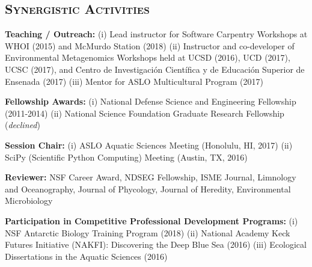 \documentclass[svgnames,11pt]{article}
\begin{document}


\subsection*{\textsc{Synergistic Activities}}

\begin{bibenum}[itemsep=4pt]

    \item \textbf{Teaching / Outreach:} (i) Lead instructor for Software Carpentry Workshops at WHOI (2015) and McMurdo Station (2018) (ii) Instructor and co-developer of Environmental Metagenomics Workshops held at UCSD (2016), UCD (2017), UCSC (2017), and Centro de Investigaci\'{o}n Cient\'{i}fica y de Educaci\'{o}n Superior de Ensenada (2017) (iii) Mentor for ASLO Multicultural Program (2017)

    \item \textbf{Fellowship Awards:} (i) National Defense Science and Engineering Fellowship (2011-2014) (ii) National Science Foundation Graduate Research Fellowship (\textit{declined})

    \item \textbf{Session Chair:} (i) ASLO Aquatic Sciences Meeting (Honolulu, HI, 2017) (ii) SciPy (Scientific Python Computing) Meeting (Austin, TX, 2016)

    \item \textbf{Reviewer:} NSF Career Award, NDSEG Fellowship, ISME Journal, Limnology and Oceanography, Journal of Phycology, Journal of Heredity, Environmental Microbiology

    \item \textbf{Participation in Competitive Professional Development Programs:}
    (i) NSF Antarctic Biology Training Program (2018) (ii) National Academy Keck Futures Initiative (NAKFI): Discovering the Deep Blue Sea (2016) (iii)  Ecological Dissertations in the Aquatic Sciences (2016)

\end{bibenum}
\end{document}
